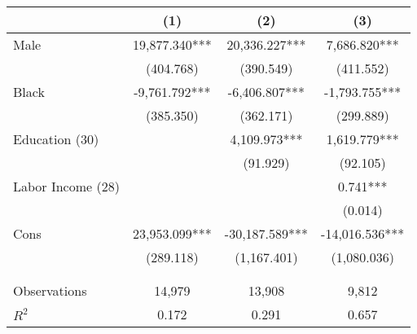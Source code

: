 \begin{tabular}{lccc} \toprule
 & (1) & (2) & (3) \\ \midrule
Male & 19,877.340*** & 20,336.227*** & 7,686.820*** \\
 & (404.768) & (390.549) & (411.552) \\
Black & -9,761.792*** & -6,406.807*** & -1,793.755*** \\
 & (385.350) & (362.171) & (299.889) \\
Education (30)  &  & 4,109.973*** & 1,619.779*** \\
 &  & (91.929) & (92.105) \\
Labor Income (28) &  &  & 0.741*** \\
 &  &  & (0.014) \\
Cons & 23,953.099*** & -30,187.589*** & -14,016.536*** \\
 & (289.118) & (1,167.401) & (1,080.036) \\
 &  &  &  \\ \\ \midrule
Observations & 14,979 & 13,908 & 9,812 \\
$R^2$ & 0.172 & 0.291 & 0.657 \\ \bottomrule
\end{tabular}
